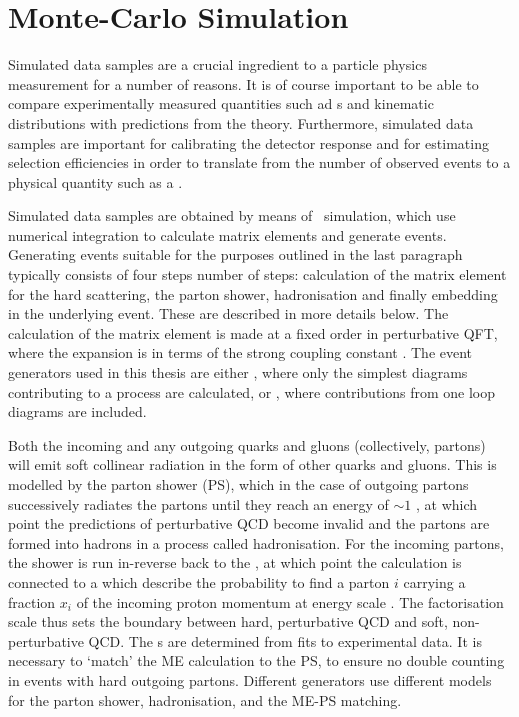 \section{Monte-Carlo Simulation}
\label{sec:Theory-MC}

Simulated data samples are a crucial ingredient to a particle physics
measurement for a number of reasons. It is of course important to be able to
compare experimentally measured quantities such ad \cx s and kinematic
distributions with predictions from the theory. Furthermore, simulated data
samples are important for calibrating the detector response and for estimating
selection efficiencies in order to translate from the number of observed events
to a physical quantity such as a \cx. 

Simulated data samples are obtained by
means of \mc\ simulation, which use numerical integration to calculate matrix
elements and generate events. Generating events suitable for the purposes
outlined in the last paragraph typically consists of four steps number of steps:
calculation of the matrix element for the hard scattering, the parton shower,
hadronisation and finally embedding in the underlying event. These are described
in more details below. The calculation of the matrix element is
made at a fixed order in perturbative QFT, where the expansion is in terms of
the strong coupling constant \alphaS. The event generators used in this thesis
are either , where only the simplest diagrams
contributing to a process are calculated, or ,
where contributions from one loop diagrams are included. 

Both the incoming and any outgoing quarks and gluons
(collectively, partons) will emit soft collinear radiation in the form of other quarks and gluons. This is
modelled by the parton shower (PS), which in the case of outgoing partons
successively radiates the partons until they reach an energy of $\sim 1$ \gev, at
which point the predictions of perturbative QCD become invalid and the partons
are formed into hadrons in a process called hadronisation. For the incoming partons, the
shower is run in-reverse back to the , at which
point the calculation is connected to a  which describe the probability to find a parton $i$ carrying a
fraction $x_i$ of the incoming proton momentum at energy scale \uF. The
factorisation scale thus sets the boundary between hard, perturbative QCD and
soft, non-perturbative QCD. The \partDF s are determined from fits to
experimental data. It is necessary to `match' the
ME calculation to the PS, to ensure no double counting in events with hard
outgoing partons. Different generators use different models for the parton
shower, hadronisation, and the ME-PS matching.

